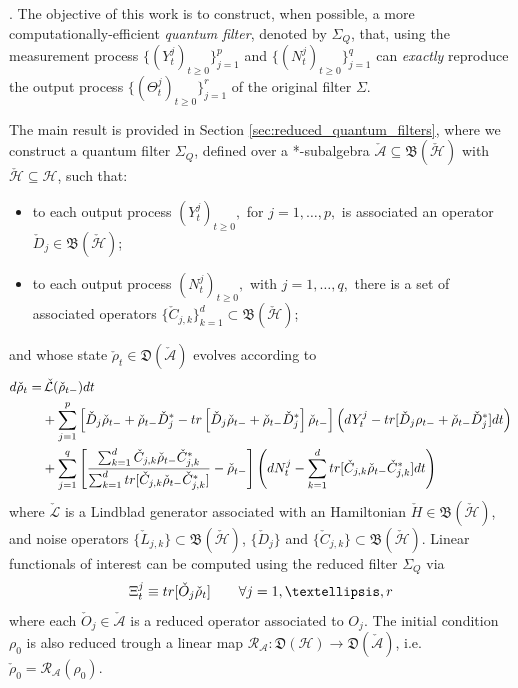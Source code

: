 \documentclass[aihp,12pt]{imsart}
\newcommand{\Hc}{\mathcal{H}}
\newcommand{\Rc}{\mathcal{R}}
\newcommand{\Lc}{\mathcal{L}}
\newcommand{\As}{\mathscr{A}}
\newcommand{\Bf}{\mathfrak{B}}
\newcommand{\Df}{\mathfrak{D}}
\newcommand{\tr}{{\rm tr}}
\theoremstyle{theorem}
\theoremstyle{definition}
\theoremstyle{remark}
\begin{document}
. The objective of this work is to construct, when possible, a more computationally-efficient  {\em quantum filter}, denoted by $\Sigma_Q$, that, using the measurement process $\{(Y_t^j)_{t\geq0}\}_{j=1}^p$ and $\{(N_t^j)_{t\geq0}\}_{j=1}^q$ can {\em exactly} reproduce the output process $\{(\Theta_t^j)_{t\geq0}\}_{j=1}^r$ of the original filter $\Sigma$. 

The main result is provided in Section \ref{sec:reduced_quantum_filters}, where we construct a quantum filter ${\Sigma}_Q$, defined over a *-subalgebra $\check{\As}\subseteq\Bf(\check{\Hc})$ with $\check{\Hc}\subseteq\Hc$, such that: 
\begin{itemize}
    \item to each output process $(Y_t^j)_{t\geq0},$ for $j=1,\dots,p,$  is associated an operator \(\check{D}_j\in\Bf(\check{\Hc})\);
    \item to each output process $(N_t^j)_{t\geq0},$ with  $j=1,\dots,q,$ there is a set of associated operators $\{\check{C}_{j,k}\}_{k=1}^d\subset\Bf(\check{\Hc})$;
\end{itemize}
and whose state $\check{\rho}_t\in\Df(\check{\As})$ evolves according to 
\begin{equation}
    \begin{split}
        d\check{\rho}_t = &\,\check{\Lc}(\check{\rho}_{t-}) dt \\&+ \sum_{j=1}^{p}\left[\check{D}_j\check{\rho}_{t-}+\check\rho_{t-} {\check{D}_j}^* - \tr\left[\check{D}_j\check\rho_{t-}+\check\rho_{t-} {\check{D}_j}^*\right]\check{\rho}_{t-}\right] \left(dY_t^j - \tr[\check{D}_j\rho_{t-}+\check\rho_{t-} {\check{D}_j}^*]dt\right)\\ &+ \sum_{j=1}^{q} \left[  \frac{\sum_{k=1}^d\check{C}_{j,k}\check\rho_{t-}\check{C}_{j,k}^*}{\sum_{k=1}^d\tr[\check{C}_{j,k}\check\rho_{t-}\check{C}_{j,k}^*]} - \check{\rho}_{t-} \right]\left(dN_t^j-\sum_{k=1}^d\tr[\check{C}_{j,k}\check\rho_{t-}\check{C}_{j,k}^*]dt\right)
    \end{split}
    \label{eq:reduced_quantum_filter}
\end{equation}
where $\check{\Lc}$ is a Lindblad generator associated with an Hamiltonian $\check{H}\in\Bf(\check{\Hc})$, and noise operators \(\{\check{L}_{j,k}\}\subset\Bf(\check{\Hc})\), $\{\check{D}_{j}\}$ and $\{\check{C}_{j,k}\}\subset\Bf(\check{\Hc})$. 
Linear functionals of interest can be computed using the reduced filter $\Sigma_Q$ via 
\begin{equation}
     \Xi_t^j \equiv \tr[\check{O}_j\check{\rho}_t]\qquad\forall j=1,\dots,r
\end{equation}
where each $\check{O}_j\in\check{\As}$ is a reduced operator associated to $O_j$. The initial condition \(\rho_0\) is also reduced trough a linear map $\Rc_\As:\Df(\Hc)\to\Df(\check{\As})$, i.e. $\check{\rho}_0=\Rc_\As(\rho_0)$.
\end{document}

